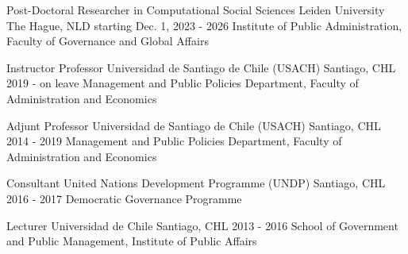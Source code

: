 





\begin{cventries}
\cventry
{Post-Doctoral Researcher in Computational Social Sciences} 
{Leiden University} 
{The Hague, NLD} 
{starting Dec. 1, 2023 - 2026}
{Institute of Public Administration, Faculty of Governance and Global Affairs} \vspace{1.5mm}

\cventry
{Instructor Professor} 
{Universidad de Santiago de Chile (USACH)} 
{Santiago, CHL} 
{2019 - on leave}
{Management and Public Policies Department, Faculty of Administration and Economics} \vspace{1.5mm}
\end{cventries}


\begin{cventries}
\cventry
{Adjunt Professor} 
{Universidad de Santiago de Chile (USACH)} 
{Santiago, CHL} 
{2014 - 2019}
{Management and Public Policies Department, Faculty of Administration and Economics} \vspace{1.5mm}

\cventry
{Consultant} 
{United Nations Development Programme (UNDP)} 
{Santiago, CHL} 
{2016 - 2017}
{Democratic Governance Programme} \vspace{1.5mm}

\cventry
{Lecturer} 
{Universidad de Chile} 
{Santiago, CHL} 
{2013 - 2016}
{School of Government and Public Management, Institute of Public Affairs}\vspace{1.5mm}
\end{cventries}
